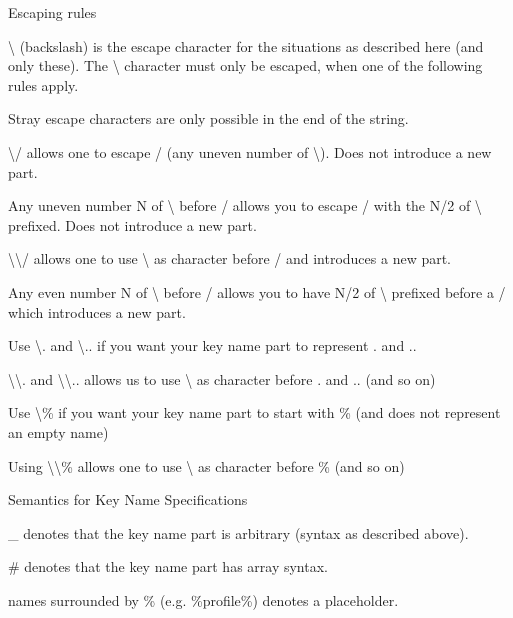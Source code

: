 \begin{DoxyItemize}
\begin{DoxyParagraph}{Escaping rules}
\begin{DoxyItemize}
\item \textbackslash{} (backslash) is the escape character for the situations as described here (and only these). The \textbackslash{} character must only be escaped, when one of the following rules apply.
\item Stray escape characters are only possible in the end of the string.
\item \textbackslash{}/ allows one to escape / (any uneven number of \textbackslash{}). Does not introduce a new part.
\item Any uneven number N of \textbackslash{} before / allows you to escape / with the N/2 of \textbackslash{} prefixed. Does not introduce a new part.
\item \textbackslash{}\textbackslash{}/ allows one to use \textbackslash{} as character before / and introduces a new part.
\item Any even number N of \textbackslash{} before / allows you to have N/2 of \textbackslash{} prefixed before a / which introduces a new part.
\item Use \textbackslash{}. and \textbackslash{}.. if you want your key name part to represent . and ..
\item \textbackslash{}\textbackslash{}. and \textbackslash{}\textbackslash{}.. allows us to use \textbackslash{} as character before . and .. (and so on)
\item Use \textbackslash{}\% if you want your key name part to start with \% (and does not represent an empty name)
\item Using \textbackslash{}\textbackslash{}\% allows one to use \textbackslash{} as character before \% (and so on)
\end{DoxyItemize}
\end{DoxyParagraph}
\begin{DoxyParagraph}{Semantics for Key Name Specifications}

\begin{DoxyItemize}
\item \+\_\+ denotes that the key name part is arbitrary (syntax as described above).
\item \# denotes that the key name part has array syntax.
\item names surrounded by \% (e.\+g. \%profile\%) denotes a placeholder. 
\end{DoxyItemize}
\end{DoxyParagraph}

\end{DoxyItemize}

